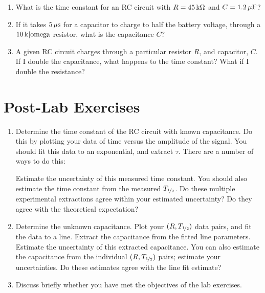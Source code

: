 \documentclass[12pt]{article}
\newcommand{\halflife}{\ensuremath{T_{\nicefrac{1}{2}}}\xspace}
\begin{document}
\begin{enumerate}
\item What is the time constant for an RC circuit with $R =
  \unit[45]{k\Omega}$ and $C = \unit[1.2]{\mu F}$?
\item If it takes $\unit[5]{\mu s}$ for a capacitor to charge to half
  the battery voltage, through a $\unit[10]{k|omega}$ resistor, what
  is the capacitance $C$?
\item A given RC circuit charges through a particular resistor $R$,
  and capacitor, $C$.  If I double the capacitance, what happens to
  the time constant?  What if I double the resistance?
\end{enumerate}

\newpage

\section*{Post-Lab Exercises}

\begin{enumerate}
\item Determine the time constant of the RC circuit with known
  capacitance.  Do this by plotting your data of time versus the
  amplitude of the signal.  You should fit this data to an
  exponential, and extract $\tau$.  There are a number of ways to do
  this:
  Estimate the uncertainty of this measured time constant.  You should
  also estimate the time constant from the measured \halflife.  Do
  these multiple experimental extractions agree within your estimated
  uncertainty?  Do they agree with the theoretical expectation?
\item Determine the unknown capacitance.  Plot your $(R, \halflife)$
  data pairs, and fit the data to a line.  Extract the capacitance
  from the fitted line parameters.  Estimate the uncertainty of this
  extracted capacitance.  You can also estimate the capacitance from
  the individual $(R, \halflife)$ pairs; estimate your uncertainties.
  Do these estimates agree with the line fit estimate?
\item Discuss briefly whether you have met the objectives of the lab
  exercises.
\end{enumerate}
\end{document}
